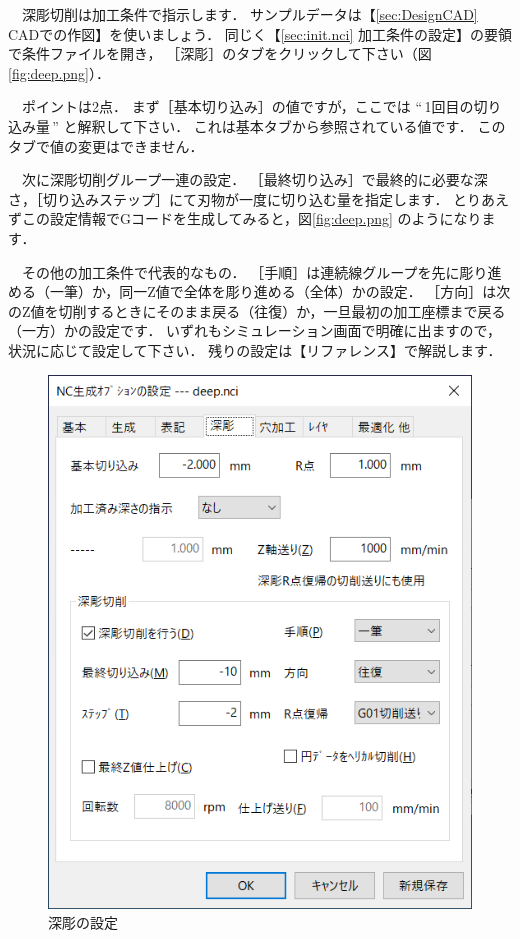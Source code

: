 \begin{minipage}[t]{0.5\textwidth}
　深彫切削は加工条件で指示します．
サンプルデータは【\ref{sec:DesignCAD} CADでの作図】を使いましょう．
同じく【\ref{sec:init.nci} 加工条件の設定】の要領で条件ファイルを開き，
［深彫］のタブをクリックして下さい（図\ref{fig:deep.png}）．

　ポイントは2点．
まず［基本切り込み］の値ですが，ここでは ``\,1回目の切り込み量\,'' と解釈して下さい．
これは基本タブから参照されている値です．
このタブで値の変更はできません．

　次に深彫切削グループ一連の設定．
［最終切り込み］で最終的に必要な深さ，［切り込みステップ］にて刃物が一度に切り込む量を指定します．
とりあえずこの設定情報でGコードを生成してみると，図\ref{fig:deep.png} のようになります．

　その他の加工条件で代表的なもの．
［手順］は連続線グループを先に彫り進める（一筆）か，同一Z値で全体を彫り進める（全体）かの設定．
［方向］は次のZ値を切削するときにそのまま戻る（往復）か，一旦最初の加工座標まで戻る（一方）かの設定です．
いずれもシミュレーション画面で明確に出ますので，状況に応じて設定して下さい．
残りの設定は【リファレンス】で解説します．
\end{minipage}
\begin{minipage}[t]{0.5\textwidth}
\vspace*{-2zh}
\begin{figure}[H]
\centering
\includegraphics[scale=0.7]{No3/fig/deep-setup.png}
\caption{深彫の設定}
\label{fig:deep-setup.png}
\end{figure}
\end{minipage}

